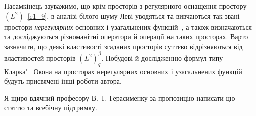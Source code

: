 Насамкінець зауважимо, що крім просторів з регулярного оснащення простору $(L^2)$~\eqref{e1_9}, в аналізі білого шуму Леві уводяться та вивчаються так звані простори {\it нерегулярних} основних і узагальнених функцій~\cite{K13_2,K21}, а також визначаються та досліджуються різноманітні оператори й операції на таких просторах. 
Варто зазначити, що деякі властивості згаданих просторів суттєво відрізняються від властивостей просторів $(L^2)^\beta_q$. 
Побудові й дослідженню формул типу Кларка"=Окона на просторах нерегулярних основних і узагальнених функцій будуть присвячені інші роботи автора.

Я щиро вдячний професору В.~І.~Герасименку за пропозицію написати цю статтю та всебічну підтримку.

